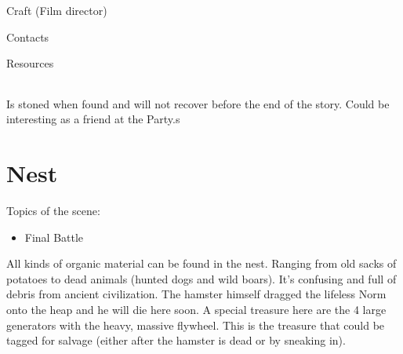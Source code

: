 \begin{npcBox}[title=Lucien\, Director]

    \begin{aspects}
    \item {}
    \item {}    
    \end{aspects}
    
    \begin{skills}
    \item {} Craft (Film director)
    \item {} Contacts
    \item {} Resources
    \end{skills}
    
    \begin{stressSection}
    \end{stressSection}
    \begin{tabularx}{\textwidth}{ XX }
    \end{tabularx}
    
    \begin{consequences}
    \item {}
    \item {}
    \item {}
    \end{consequences}
    
    \begin{npcDescription}
    Is stoned when found and will not recover before the end of the story. Could be interesting as a friend at the Party.s
    \end{npcDescription}
    
\end{npcBox}

\section{Nest}

Topics of the scene:
\begin{itemize}
\item Final Battle
\end{itemize}

All kinds of organic material can be found in the nest. Ranging from old sacks of potatoes to dead animals (hunted dogs and wild boars).
It's confusing and full of debris from ancient civilization.
The hamster himself dragged the lifeless Norm onto the heap and he will die here soon.
A special treasure here are the 4 large generators with the heavy, massive flywheel. This is the treasure that could be tagged for salvage (either after the hamster is dead or by sneaking in). 

